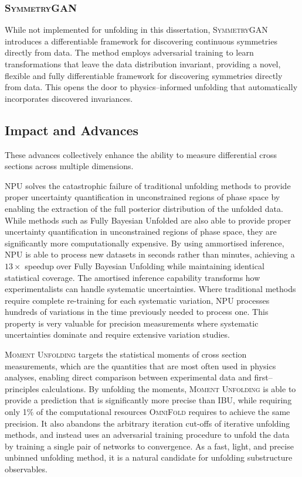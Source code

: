             \subsubsection{\textsc{SymmetryGAN}}
            While not implemented for unfolding in this dissertation, \textsc{SymmetryGAN} introduces a differentiable framework for discovering continuous symmetries directly from data.
            The method employs adversarial training to learn transformations that leave the data distribution invariant, providing a novel, flexible and fully differentiable framework for discovering symmetries directly from data.
            This opens the door to physics--informed unfolding that automatically incorporates discovered invariances.

    \subsection{Impact and Advances}
        These advances collectively enhance the ability to measure differential cross sections across multiple dimensions.
        
        NPU solves the catastrophic failure of traditional unfolding methods to provide proper uncertainty quantification in unconstrained regions of phase space by enabling the extraction of the full posterior distribution of the unfolded data.
        While methods such as Fully Bayesian Unfolded are also able to provide proper uncertainty quantification in unconstrained regions of phase space, they are significantly more computationally expensive.
        By using ammortised inference, NPU is able to process new datasets in seconds rather than minutes, achieving a \(13\times\) speedup over Fully Bayesian Unfolding while maintaining identical statistical coverage.
        The amortised inference capability transforms how experimentalists can handle systematic uncertainties.
        Where traditional methods require complete re-training for each systematic variation, NPU processes hundreds of variations in the time previously needed to process one.
        This property is very valuable for precision measurements where systematic uncertainties dominate and require extensive variation studies.

        \textsc{Moment Unfolding} targets the statistical moments of cross section measurements, which are the quantities that are most often used in physics analyses, enabling direct comparison between experimental data and first--principles calculations.
        By unfolding the moments, \textsc{Moment Unfolding} is able to provide a prediction that is significantly more precise than IBU, while requiring only 1\(\%\) of the computational resources \textsc{OmniFold} requires to achieve the same precision.
        It also abandons the arbitrary iteration cut-offs of iterative unfolding methods, and instead uses an adversarial training procedure to unfold the data by training a single pair of networks to convergence.
        As a fast, light, and precise unbinned unfolding method, it is a natural candidate for unfolding substructure observables.
        
